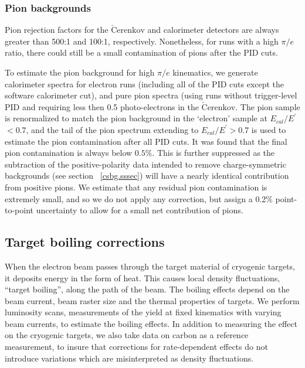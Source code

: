 \subsubsection{Pion backgrounds}\label{picont.sssec}

Pion rejection factors for the $\mathrm{\check{C}erenkov}$ and calorimeter
detectors are always greater than 500:1 and 100:1, respectively.  Nonetheless,
for runs with a high $\pi/e$ ratio, there could still be a small contamination
of pions after the PID cuts.

%

To estimate the pion background for high $\pi/e$ kinematics, we generate
calorimeter spectra for electron runs (including all of the PID cuts except
the software calorimeter cut), and pure pion spectra (using runs without
trigger-level PID and requiring less then 0.5 photo-electrons in the
$\mathrm{\check{C}erenkov}$.  The pion sample is renormalized to match the
pion background in the `electron' sample at $E_{cal}/E^{\prime}$$<$0.7, and
the tail of the pion spectrum extending to $E_{cal}/E^{\prime}$$>$0.7 is
used to estimate the pion contamination after all PID cuts. It was found that
the final pion contamination is always below $0.5\%$.  This is further
suppressed as the subtraction of the positive-polarity data intended to remove
charge-symmetric backgrounds (see section ~\ref{csbg.sssec}) will have a
nearly identical contribution from positive pions.  We estimate that any
residual pion contamination is extremely small, and so we do not apply any
correction, but assign a 0.2\% point-to-point uncertainty to
allow for a small net contribution of pions.


\subsection{Target boiling corrections}\label{tarboil.ssec}
When the electron beam passes through the target material of cryogenic
targets, it deposits energy in the form of heat. This causes local density
fluctuations, ``target boiling'', along the path of the beam. The boiling
effects depend on the beam current, beam raster size and the thermal
properties of targets. We perform luminosity scans, measurements of the yield
at fixed kinematics with varying beam currents, to estimate the boiling
effects. In addition to measuring the effect on the cryogenic targets, we also
take data on carbon as a reference measurement, to insure that corrections for
rate-dependent effects do not introduce variations which are misinterpreted as
density fluctuations.

